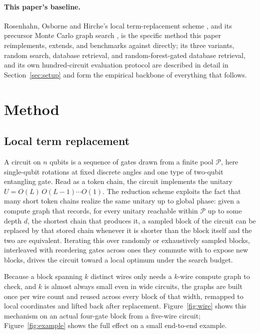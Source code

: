 \documentclass[11pt]{article}
\begin{document}
\paragraph{This paper's baseline.} Rosenhahn, Osborne and Hirche's local
term-replacement scheme \cite{Rosenhahn2025Optimization}, and its
precursor Monte Carlo graph search \cite{RosenhahnTobias2023MCGS}, is the
specific method this paper reimplements, extends, and benchmarks against
directly; its three variants, random search, database retrieval, and
random-forest-gated database retrieval, and its own hundred-circuit
evaluation protocol are described in detail in Section~\ref{sec:setup} and
form the empirical backbone of everything that follows.

\section{Method}
\label{sec:method}

\subsection{Local term replacement}

A circuit on $n$ qubits is a sequence of gates drawn from a finite pool
$\mathcal{P}$, here single-qubit rotations at fixed discrete angles and one
type of two-qubit entangling gate. Read as a token chain, the circuit
implements the unitary $U = O(L)\,O(L-1)\cdots O(1)$. The reduction scheme
exploits the fact that many short token chains realize the same unitary up
to global phase: given a compute graph that records, for every unitary
reachable within $\mathcal{P}$ up to some depth $d$, the shortest chain that
produces it, a sampled block of the circuit can be replaced by that stored
chain whenever it is shorter than the block itself and the two are
equivalent. Iterating this over randomly or exhaustively sampled blocks,
interleaved with reordering gates across ones they commute with to expose
new blocks, drives the circuit toward a local optimum under the search
budget.

Because a block spanning $k$ distinct wires only needs a $k$-wire compute
graph to check, and $k$ is almost always small even in wide circuits, the
graphs are built once per wire count and reused across every block of that
width, remapped to local coordinates and lifted back after replacement.
Figure~\ref{fig:wire} shows this mechanism on an actual four-gate block from
a five-wire circuit; Figure~\ref{fig:example} shows the full effect on a
small end-to-end example.
\end{document}
